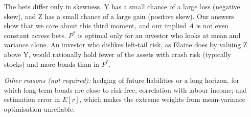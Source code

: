 \documentclass[11pt]{article}
\begin{document}
The bets differ only in skewness. Y has a small chance of a large loss
(negative skew), and Z has a small chance of a large gain (positive
skew). Our answers show that we care about this third moment, and our
implied \(A\) is not even constant across bets. \(P^*\) is optimal only
for an investor who looks at mean and variance alone. An investor who
dislikes left-tail risk, as Elaine does by valuing Z above Y, would
rationally hold fewer of the assets with crash risk (typically stocks)
and more bonds than in \(P^*\).

\emph{Other reasons (not required):} hedging of future liabilities or a
long horizon, for which long-term bonds are close to risk-free;
correlation with labour income; and estimation error in \(E[r]\), which
makes the extreme weights from mean-variance optimisation unreliable.


    
    
    
\end{document}

